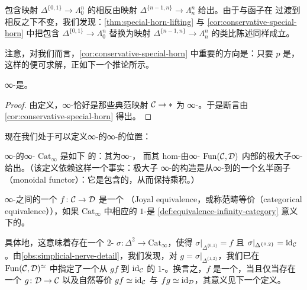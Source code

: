 \begin{remark}\label{rem:opposite-special-horn}
包含映射 $\Delta^{\{0,1\}} \to \Lambda^n_0$ 的相反由映射
$\Delta^{\{n-1,n\}} \to \Lambda^n_n$ 给出。由于\trInnerFibration{}与\trConservative{}函子在
过渡到相反之下不变，我们发现：\cref{thm:special-horn-lifting} 与
\cref{cor:conservative-special-horn} 中把包含 $\Delta^{\{0,1\}} \to \Lambda^n_0$
替换为映射 $\Delta^{\{n-1,n\}} \to \Lambda^n_n$ 的类比陈述同样成立。
\end{remark}

注意，对我们而言，\cref{cor:conservative-special-horn} 中重要的方向是：只要
$p$ 是\trConservative{}，这样的\trLiftingProblem{}便可求解，正如下一个推论所示。

\begin{corollary}\label{cor:infinity-groupoids-kan}
∞-\trGroupoid{}是\trKanComplex{}。
\end{corollary}

\begin{proof}
由定义，∞-\trGroupoid{}恰好是那些典范映射 $\mathcal{C} \to \ast$ 为\trConservative{}%
∞-\trCategories{}。于是断言由\cref{cor:conservative-special-horn} 得出。
\end{proof}

现在我们处于可以定义∞-\trCategories{}的∞-\trCategory{}的位置：

\begin{definition}\label{def:cat-infinity}
∞-\trCategories{}的∞-\trCategory{} $\mathrm{Cat}_\infty$ 是如下%
\trSimplicialCategory{}的\trCoherentNerve{}：其\trObject{}为∞-\trCategories{}，
而其 hom-\trSimplicialSets{}由\trFunctor{}∞-\trCategory{} $\mathrm{Fun}(\mathcal{C}, \mathcal{D})$
内部的极大子∞-\trGroupoid{}给出。（该定义依赖这样一个事实：极大子
∞-\trGroupoid{}的构造是从∞-\trCategories{}到\trKanComplex{}的一个幺半函子
（monoidal functor）：它是包含的\trRightAdjoint{}，从而保持乘积。）
\end{definition}

\begin{definition}\label{def:joyal-equivalence}
∞-\trCategories{}之间的一个\trFunctor{} $f\colon \mathcal{C} \to \mathcal{D}$ 是一个%
\emph{\trJoyalEquivalence{}}（Joyal equivalence，或称范畴等价（categorical
equivalence）），如果 $\mathrm{Cat}_\infty$ 中相应的 $1$-\trSimplex{}是
\cref{def:equivalence-infinity-category} 意义下的\trEquivalence{}。
\end{definition}

\begin{remark}\label{rem:joyal-equivalence-concretely}
具体地，这意味着存在一个 $2$-\trSimplex{}%
$\sigma\colon \Delta^2 \to \mathrm{Cat}_\infty$，使得
$\sigma|_{\Delta^{\{0,1\}}} = f$ 且 $\sigma|_{\Delta^{\{0,2\}}} = \mathrm{id}_{\mathcal{C}}$。由\cref{obs:simplicial-nerve-detail}，我们发现，对
$g = \sigma|_{\Delta^{\{1,2\}}}$，我们已在
$\mathrm{Fun}(\mathcal{C}, \mathcal{D})^{\simeq}$ 中指定了一个从 $gf$ 到 $\mathrm{id}_{\mathcal{C}}$ 的
$1$-\trSimplex{}。换言之，$f$ 是一个\trEquivalence{}，当且仅当存在一个%
\trFunctor{} $g\colon \mathcal{D} \to \mathcal{C}$ 以及自然等价 $gf \simeq \mathrm{id}_{\mathcal{C}}$ 与
$fg \simeq \mathrm{id}_{\mathcal{D}}$，其意义见下一个定义。
\end{remark}

